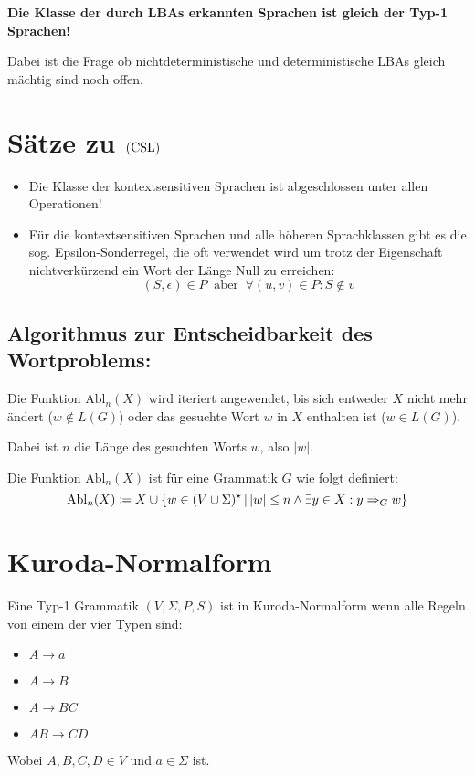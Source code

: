 \textbf{Die Klasse der durch LBAs erkannten Sprachen ist gleich der Typ-1 Sprachen!}

Dabei ist die Frage ob nichtdeterministische und deterministische LBAs gleich mächtig sind noch offen.



\section{Sätze zu $\mathrm{(CSL)}$}
\begin{itemize}
	\item Die Klasse der kontextsensitiven Sprachen ist abgeschlossen unter allen Operationen!
	\item Für die kontextsensitiven Sprachen und alle höheren Sprachklassen gibt es die sog. Epsilon-Sonderregel, die oft verwendet wird um trotz der Eigenschaft nichtverkürzend ein Wort der Länge Null zu erreichen:
	\begin{equation*}
		(S,\epsilon)\in P \ \text{ aber }\  \forall (u,v)\in P:S\not\in v
	\end{equation*}
\end{itemize}

\subsection{Algorithmus zur Entscheidbarkeit des Wortproblems:}
Die Funktion $\mathrm{Abl}_n(X)$ wird iteriert angewendet, bis sich entweder $X$ nicht mehr ändert ($w\not\in L(G)$) oder das gesuchte Wort $w$ in $X$ enthalten ist ($w\in L(G)$).

Dabei ist $n$ die Länge des gesuchten Worts $w$, also $|w|$.

Die Funktion $\mathrm{Abl}_n(X)$ ist für eine Grammatik $G$ wie folgt definiert:
\begin{equation*}
	\mathrm{Abl}_n(X)\coloneqq X\cup\left\{ w\in(V\cup\Sigma)^\star \,\middle|\, |w|\leq n \wedge \exists y\in X:y\Rightarrow_G w \right\}
\end{equation*}


\section{Kuroda-Normalform}
Eine Typ-1 Grammatik $(V,\Sigma, P, S)$ ist in Kuroda-Normalform wenn alle Regeln von einem der vier Typen sind:
\begin{itemize}
	\item $A\rightarrow a$
	\item $A\rightarrow B$
	\item $A\rightarrow BC$
	\item $AB\rightarrow CD$
\end{itemize}
Wobei $A,B,C,D\in V$ und $a\in \Sigma$ ist.

